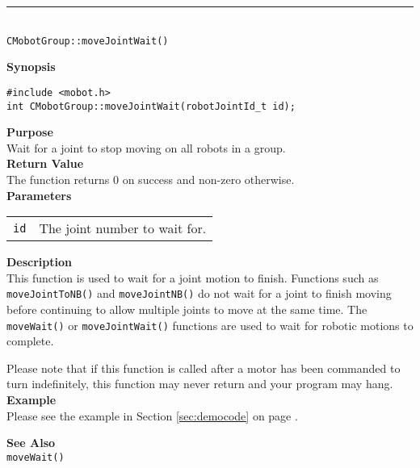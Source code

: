 \noindent
\vspace{5pt}
\rule{4.5in}{0.015in}\\
\noindent
{\LARGE \texttt{CMobotGroup::moveJointWait()}}\\
{}

\noindent
{\bf Synopsis}
\vspace{-8pt}
\begin{verbatim}
#include <mobot.h>
int CMobotGroup::moveJointWait(robotJointId_t id);
\end{verbatim}

\noindent
{\bf Purpose}\\
Wait for a joint to stop moving on all robots in a group.\\

\noindent
{\bf Return Value}\\
The function returns 0 on success and non-zero otherwise.\\

\noindent
{\bf Parameters}
\vspace{-0.1in}
\begin{description}
\item               
\begin{tabular}{p{10 mm}p{145 mm}}
\texttt{id} & The joint number to wait for. \\
\end{tabular}
\end{description}

\noindent
{\bf Description}\\
This function is used to wait for a joint motion to finish. Functions such as
\texttt{moveJointToNB()} and \texttt{moveJointNB()} do not wait for a joint to finish
moving before continuing to allow multiple joints to move at the same time. The
\texttt{moveWait()} or \texttt{moveJointWait()} functions are used to wait for
robotic motions to complete.

Please note that if this function is called after a motor has been commanded to
turn indefinitely, this function may never return and your program may hang.\\

\noindent
{\bf Example}\\
Please see the example in Section \ref{sec:democode} on page \pageref{sec:democode}.\\
\noindent

\noindent
{\bf See Also}\\
\texttt{moveWait()}

